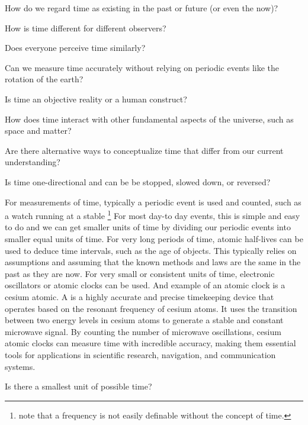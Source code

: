 \begin{questions}
	\item How do we regard time as existing in the past or future (or even the now)?
 	\item How is time different for different observers?
  	\item Does everyone perceive time similarly?
   	\item Can we measure time accurately without relying on periodic events like the rotation of the earth?
    	\item Is time an objective reality or a human construct?
     	\item How does time interact with other fundamental aspects of the universe, such as space and matter?
      	\item Are there alternative ways to conceptualize time that differ from our current understanding?
       	\item Is time one-directional and can be be stopped, slowed down, or reversed?
\end{questions}

For measurements of time, typically a periodic event is used and counted, such as a watch running at a stable \footnote{note that a frequency is not easily definable without the concept of time.} For most day-to day events, this is simple and easy to do and we can get smaller units of time by dividing our periodic events into smaller equal units of time. For very long periods of time, atomic half-lives can be used to deduce time intervals, such as the age of objects. This typically relies on assumptions and assuming that the known methods and laws are the same in the past as they are now. For very small or consistent units of time, electronic oscillators or atomic clocks can be used. And example of an atomic clock is a cesium atomic. A  is a highly accurate and precise timekeeping device that operates based on the resonant frequency of cesium atoms. It uses the transition between two energy levels in cesium atoms to generate a stable and constant microwave signal. By counting the number of microwave oscillations, cesium atomic clocks can measure time with incredible accuracy, making them essential tools for applications in scientific research, navigation, and communication systems.

\begin{questions}
	\item Is there a smallest unit of possible time?
\end{questions}


